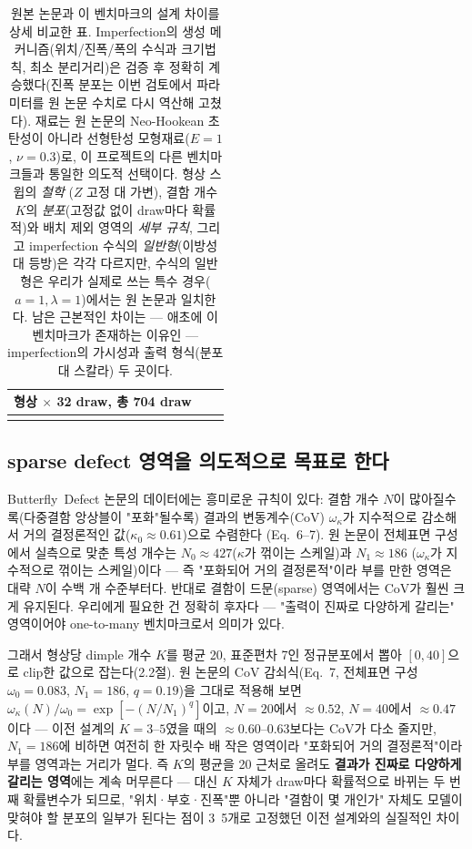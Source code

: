 \documentclass[11pt]{article}
\begin{document}
\begin{longtable}{@{}p{2.6cm}p{5.4cm}p{5.4cm}@{}}
  형상 $\times$ 32 draw, 총 704 draw \\
\bottomrule
\caption{원본 논문과 이 벤치마크의 설계 차이를 상세 비교한 표. Imperfection의
생성 메커니즘(위치/진폭/폭의 수식과 크기법칙, 최소 분리거리)은 검증 후
정확히 계승했다(진폭 분포는 이번 검토에서 파라미터를 원 논문 수치로 다시
역산해 고쳤다). 재료는 원 논문의 Neo-Hookean 초탄성이 아니라 선형탄성
모형재료($E{=}1$, $\nu{=}0.3$)로, 이 프로젝트의 다른 벤치마크들과 통일한
의도적 선택이다. 형상 스윕의 \emph{철학}
($Z$ 고정 대 가변), 결함 개수 $K$의 \emph{분포}(고정값 없이 draw마다
확률적)와 배치 제외 영역의 \emph{세부 규칙}, 그리고 imperfection 수식의
\emph{일반형}(이방성 대 등방)은 각각 다르지만, 수식의 일반형은 우리가
실제로 쓰는 특수 경우($a{=}1,\lambda{=}1$)에서는 원 논문과 일치한다.
남은 근본적인 차이는 --- 애초에 이 벤치마크가 존재하는 이유인 ---
imperfection의 가시성과 출력 형식(분포 대 스칼라) 두 곳이다.}
\end{longtable}

\subsection{sparse defect 영역을 의도적으로 목표로 한다}

Butterfly~Defect 논문의 데이터에는 흥미로운 규칙이 있다: 결함 개수 $N$이
많아질수록(다중결함 앙상블이 "포화"될수록) 결과의 변동계수(CoV) $\omega_\kappa$가
지수적으로 감소해서 거의 결정론적인 값($\kappa_0 \approx 0.61$)으로 수렴한다
(Eq.~6--7). 원 논문이 전체표면 구성에서 실측으로 맞춘 특성 개수는
$N_0 \approx 427$($\kappa$가 꺾이는 스케일)과 $N_1 \approx 186$
($\omega_\kappa$가 지수적으로 꺾이는 스케일)이다 --- 즉 "포화되어 거의
결정론적"이라 부를 만한 영역은 대략 $N$이 수백 개 수준부터다. 반대로 결함이
드문(sparse) 영역에서는 CoV가 훨씬 크게 유지된다. 우리에게 필요한 건 정확히
후자다 --- "출력이 진짜로 다양하게 갈리는" 영역이어야 one-to-many 벤치마크로서
의미가 있다.

그래서 형상당 dimple 개수 $K$를 평균 20, 표준편차 7인 정규분포에서 뽑아
$[0,40]$으로 clip한 값으로 잡는다(2.2절). 원 논문의 CoV 감쇠식(Eq.~7, 전체표면
구성 $\omega_0{=}0.083$, $N_1{=}186$, $q{=}0.19$)을 그대로 적용해 보면
$\omega_\kappa(N)/\omega_0 = \exp[-(N/N_1)^q]$이고, $N{=}20$에서 $\approx0.52$,
$N{=}40$에서 $\approx0.47$이다 --- 이전 설계의 $K{=}3$--$5$였을 때의
$\approx0.60$--$0.63$보다는 CoV가 다소 줄지만, $N_1{=}186$에 비하면 여전히
한 자릿수 배 작은 영역이라 "포화되어 거의 결정론적"이라 부를 영역과는 거리가
멀다. 즉 $K$의 평균을 20 근처로 올려도 \textbf{결과가 진짜로 다양하게 갈리는
영역}에는 계속 머무른다 --- 대신 $K$ 자체가 draw마다 확률적으로 바뀌는 두
번째 확률변수가 되므로, "위치·부호·진폭"뿐 아니라 "결함이 몇 개인가" 자체도
모델이 맞혀야 할 분포의 일부가 된다는 점이 3~5개로 고정했던 이전 설계와의
실질적인 차이다.
\end{document}
